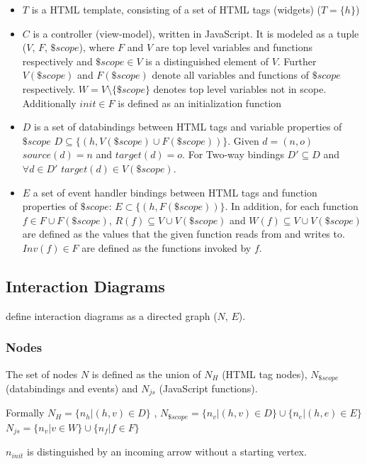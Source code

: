 \begin{itemize}
  \item $T$ is a HTML template, consisting of a set of HTML tags (widgets) ($T = \{h\}$)
  \item 
  $C$ is a controller (view-model), written in JavaScript. It is modeled as a tuple ($V$, $F$, $\$scope$), where $F$ and $V$ are top level variables and functions respectively and $\$scope \in V$ is a distinguished element of $V$. Further $V(\$scope)$ and $F(\$scope)$ denote all variables and functions of $\$scope$ respectively. $W = V \setminus \{\$scope\}$ denotes top level variables not in scope. Additionally $init \in F$ is defined as an initialization function
  \item $D$ is a set of \glspl{databinding} between HTML tags and variable properties of $\$scope$ $ D \subseteq \{(h,V(\$scope) \cup F(\$scope))\}$. Given $d = (n,o)$ $source(d) = n$ and $target(d) = o$. For Two-way bindings $D' \subseteq D$ and $\forall d \in D'$ $target(d) \in V(\$scope)$.
  \item $E$ a set of event handler bindings between HTML tags and function properties of $\$scope$: $E \subset \{(h,F(\$scope))\}$. In addition, for each function $f \in F \cup F(\$scope)$, $R(f) \subseteq V \cup V(\$scope)$ and $W(f) \subseteq V \cup V(\$scope)$ are defined as the values that the given function reads from and writes to. $Inv(f) \in F $ are defined as the functions invoked by $f$. \parencite{zhang2019scenario}
\end{itemize}
\subsection{Interaction Diagrams}
\label{intro:zhang_interaction_diagrams}
\textcite{zhang2019scenario} define interaction diagrams as a directed graph ($N$, $E$). 

\subsubsection{Nodes}
The set of nodes $N$ is defined as the union of $N_H$ (HTML tag nodes), $N_{\$scope}$ (databindings and events) and  $N_{js}$ (JavaScript functions). 

Formally $N_H = \{n_h | (h,v) \in D\}$ , $N_{\$scope} = \{n_v | (h,v) \in D\} \cup \{n_e | (h,e) \in E\}$ 
$N_{js} = \{n_v | v \in W\} \cup \{n_f | f \in F\} $

$n_{init}$ is distinguished by an incoming arrow without a starting vertex.

